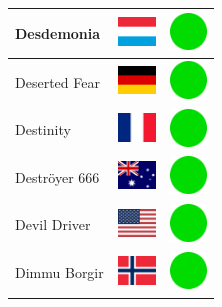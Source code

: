 \documentclass[12pt, a4paper, twoside]{report}
\begin{document}
\begin{center}
\begin{longtable}{|p{5cm}|p{2cm}|p{2cm}|}
			Desdemonia & \includegraphics[width=1cm]{4x3/lu} & \includegraphics[width=1cm]{likes/y} \\ \hline
			Deserted Fear & \includegraphics[width=1cm]{4x3/de} & \includegraphics[width=1cm]{likes/y} \\ \hline
			Destinity & \includegraphics[width=1cm]{4x3/fr} & \includegraphics[width=1cm]{likes/y} \\ \hline
			Deströyer 666 & \includegraphics[width=1cm]{4x3/au} & \includegraphics[width=1cm]{likes/y} \\ \hline
			Devil Driver & \includegraphics[width=1cm]{4x3/us} & \includegraphics[width=1cm]{likes/y} \\ \hline
			Dimmu Borgir & \includegraphics[width=1cm]{4x3/no} & \includegraphics[width=1cm]{likes/y} \\ \hline

\end{longtable}
\end{center}
\end{document}
